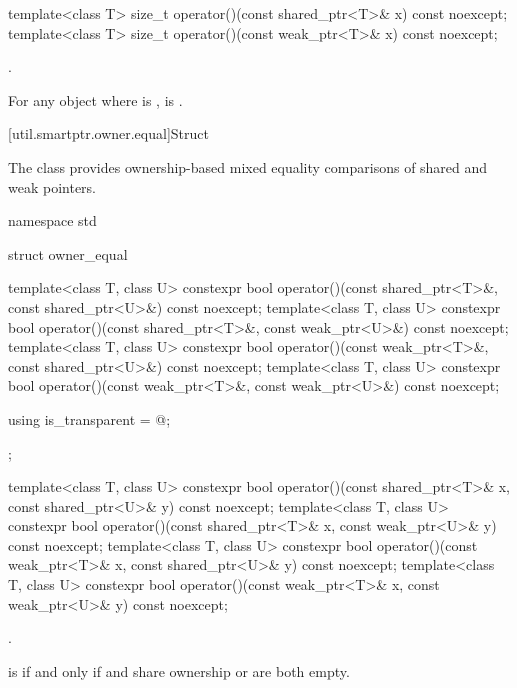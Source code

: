 %
\begin{itemdecl}
template<class T>
  size_t operator()(const shared_ptr<T>& x) const noexcept;
template<class T>
  size_t operator()(const weak_ptr<T>& x) const noexcept;
\end{itemdecl}

\begin{itemdescr}
\pnum
\returns
{}.

\pnum
\begin{note}
For any object  where  is ,
 is .
\end{note}
\end{itemdescr}

[util.smartptr.owner.equal]{Struct }

\pnum
The class  provides
ownership-based mixed equality comparisons of shared and weak pointers.

%
\begin{codeblock}
namespace std {
  struct owner_equal {
    template<class T, class U>
      constexpr bool operator()(const shared_ptr<T>&, const shared_ptr<U>&) const noexcept;
    template<class T, class U>
      constexpr bool operator()(const shared_ptr<T>&, const weak_ptr<U>&) const noexcept;
    template<class T, class U>
      constexpr bool operator()(const weak_ptr<T>&, const shared_ptr<U>&) const noexcept;
    template<class T, class U>
      constexpr bool operator()(const weak_ptr<T>&, const weak_ptr<U>&) const noexcept;

    using is_transparent = @\unspec@;
  };
}
\end{codeblock}

%
\begin{itemdecl}
template<class T, class U>
  constexpr bool operator()(const shared_ptr<T>& x, const shared_ptr<U>& y) const noexcept;
template<class T, class U>
  constexpr bool operator()(const shared_ptr<T>& x, const weak_ptr<U>& y) const noexcept;
template<class T, class U>
  constexpr bool operator()(const weak_ptr<T>& x, const shared_ptr<U>& y) const noexcept;
template<class T, class U>
  constexpr bool operator()(const weak_ptr<T>& x, const weak_ptr<U>& y) const noexcept;
\end{itemdecl}

\begin{itemdescr}
\pnum
\returns
{}.

\pnum
\begin{note}
 is 
if and only if  and  share ownership or are both empty.
\end{note}
\end{itemdescr}

